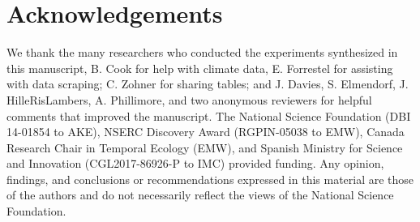 \documentclass{article}
\begin{document}



\section*{Acknowledgements}
We thank the many researchers who conducted the experiments synthesized in this manuscript, B. Cook for help with climate data, E. Forrestel for assisting with data scraping; C. Zohner for sharing tables; and J. Davies, S. Elmendorf, J. HilleRisLambers, A. Phillimore, and two anonymous reviewers for helpful comments that improved the manuscript. The National Science Foundation (DBI 14-01854 to AKE), NSERC Discovery Award (RGPIN-05038 to EMW), Canada Research Chair in Temporal Ecology (EMW), and Spanish Ministry for Science and Innovation (CGL2017-86926-P to IMC) provided funding. Any opinion, findings, and conclusions or recommendations expressed in this material are those of the authors and do not necessarily reflect the views of the National Science Foundation.

\clearpage
\end{document}
